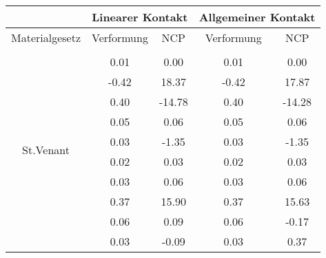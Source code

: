 \begin{table} 
\centering 
\begin{tabular}{c|cc|cc|} 
\cline{2-5} 
 & \multicolumn{2}{|c|}{Linearer Kontakt} & \multicolumn{2}{|c|}{Allgemeiner Kontakt} \\ 
\hline 
\multicolumn{1}{|c|}{Materialgesetz} & \multicolumn{1}{c|}{Verformung} & \multicolumn{1}{c|}{NCP} & \multicolumn{1}{c|}{Verformung} & \multicolumn{1}{c|}{NCP} \\ 
\hline 
\multicolumn{1}{|c|}{\multirow{16}{*}{St.Venant}} &\multicolumn{1}{|c|}{} & \multicolumn{1}{|c|}{} & \multicolumn{1}{|c|}{} & \multicolumn{1}{|c|}{} \\ 
\multicolumn{1}{|c|}{} & \multicolumn{1}{|c|}{      0.01} & \multicolumn{1}{|c|}{      0.00} & \multicolumn{1}{|c|}{      0.01} & \multicolumn{1}{|c|}{      0.00} \\ 
\multicolumn{1}{|c|}{} & \multicolumn{1}{|c|}{     -0.42} & \multicolumn{1}{|c|}{     18.37} & \multicolumn{1}{|c|}{     -0.42} & \multicolumn{1}{|c|}{     17.87} \\ 
\multicolumn{1}{|c|}{} & \multicolumn{1}{|c|}{      0.40} & \multicolumn{1}{|c|}{    -14.78} & \multicolumn{1}{|c|}{      0.40} & \multicolumn{1}{|c|}{    -14.28} \\ 
\multicolumn{1}{|c|}{} & \multicolumn{1}{|c|}{      0.05} & \multicolumn{1}{|c|}{      0.06} & \multicolumn{1}{|c|}{      0.05} & \multicolumn{1}{|c|}{      0.06} \\ 
\multicolumn{1}{|c|}{} & \multicolumn{1}{|c|}{      0.03} & \multicolumn{1}{|c|}{     -1.35} & \multicolumn{1}{|c|}{      0.03} & \multicolumn{1}{|c|}{     -1.35} \\ 
\multicolumn{1}{|c|}{} & \multicolumn{1}{|c|}{      0.02} & \multicolumn{1}{|c|}{      0.03} & \multicolumn{1}{|c|}{      0.02} & \multicolumn{1}{|c|}{      0.03} \\ 
\multicolumn{1}{|c|}{} & \multicolumn{1}{|c|}{      0.03} & \multicolumn{1}{|c|}{      0.06} & \multicolumn{1}{|c|}{      0.03} & \multicolumn{1}{|c|}{      0.06} \\ 
\multicolumn{1}{|c|}{} & \multicolumn{1}{|c|}{      0.37} & \multicolumn{1}{|c|}{     15.90} & \multicolumn{1}{|c|}{      0.37} & \multicolumn{1}{|c|}{     15.63} \\ 
\multicolumn{1}{|c|}{} & \multicolumn{1}{|c|}{      0.06} & \multicolumn{1}{|c|}{      0.09} & \multicolumn{1}{|c|}{      0.06} & \multicolumn{1}{|c|}{     -0.17} \\ 
\multicolumn{1}{|c|}{} & \multicolumn{1}{|c|}{      0.03} & \multicolumn{1}{|c|}{     -0.09} & \multicolumn{1}{|c|}{      0.03} & \multicolumn{1}{|c|}{      0.37} \\ 

\end{tabular}
\end{table}
